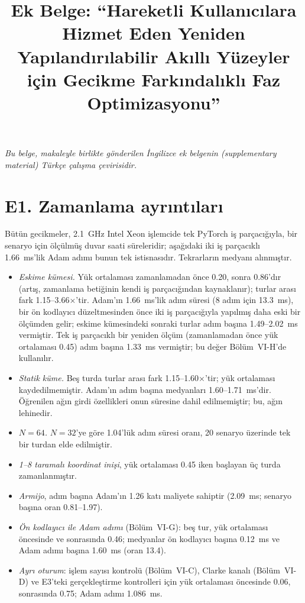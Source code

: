 \documentclass[journal,onecolumn]{IEEEtran}
\begin{document}
\title{Ek Belge: ``Hareketli Kullanıcılara Hizmet Eden Yeniden Yapılandırılabilir Akıllı Yüzeyler için Gecikme Farkındalıklı Faz Optimizasyonu''}
\maketitle
\noindent\emph{Bu belge, makaleyle birlikte gönderilen İngilizce ek belgenin (supplementary material) Türkçe çalışma çevirisidir.}

\section*{E1. Zamanlama ayrıntıları}
Bütün gecikmeler, 2.1~GHz Intel Xeon işlemcide tek PyTorch iş parçacığıyla, bir senaryo için ölçülmüş duvar saati süreleridir; aşağıdaki iki iş parçacıklı 1.66~ms'lik Adam adımı bunun tek istisnasıdır. Tekrarların medyanı alınmıştır.
\begin{itemize}
\item \emph{Eskime kümesi.} Yük ortalaması zamanlamadan önce 0.20, sonra 0.86'dır (artış, zamanlama betiğinin kendi iş parçacığından kaynaklanır); turlar arası fark 1.15--3.66$\times$'tir. Adam'ın 1.66~ms'lik adım süresi (8 adım için 13.3~ms), bir ön kodlayıcı düzeltmesinden önce iki iş parçacığıyla yapılmış daha eski bir ölçümden gelir; eskime kümesindeki sonraki turlar adım başına 1.49--2.02~ms vermiştir. Tek iş parçacıklı bir yeniden ölçüm (zamanlamadan önce yük ortalaması 0.45) adım başına 1.33~ms vermiştir; bu değer Bölüm~VI-H'de kullanılır.
\item \emph{Statik küme.} Beş turda turlar arası fark 1.15--1.60$\times$'tir; yük ortalaması kaydedilmemiştir. Adam'ın adım başına medyanları 1.60--1.71~ms'dir. Öğrenilen ağın girdi özellikleri onun süresine dahil edilmemiştir; bu, ağın lehinedir.
\item \emph{$N=64$.} $N=32$'ye göre 1.04'lük adım süresi oranı, 20 senaryo üzerinde tek bir turdan elde edilmiştir.
\item \emph{1--8 taramalı koordinat inişi}, yük ortalaması 0.45 iken başlayan üç turda zamanlanmıştır.
\item \emph{Armijo}, adım başına Adam'ın 1.26 katı maliyete sahiptir (2.09~ms; senaryo başına oran 0.81--1.97).
\item \emph{Ön kodlayıcı ile Adam adımı} (Bölüm~VI-G): beş tur, yük ortalaması öncesinde ve sonrasında 0.46; medyanlar ön kodlayıcı başına 0.12~ms ve Adam adımı başına 1.60~ms (oran 13.4).
\item \emph{Ayrı oturum}: işlem sayısı kontrolü (Bölüm~VI-C), Clarke kanalı (Bölüm~VI-D) ve E3'teki gerçekleştirme kontrolleri için yük ortalaması öncesinde 0.06, sonrasında 0.75; Adam adımı 1.086~ms.
\end{itemize}
\end{document}
